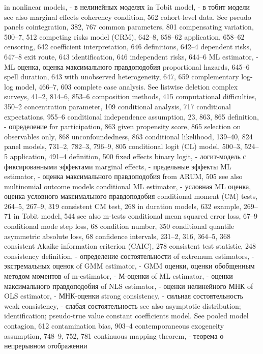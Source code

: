 in nonlinear models, - в нелинейных моделях
in Tobit model, - в тобит модели
see also marginal effects
coherency condition, 562
cohort-level data. See pseudo panels cointegration, 382, 767
common parameters, 801
compensating variation, 500–7, 512 competing risks model (CRM), 642–8, 658–62
application, 658–62 censoring, 642
coefficient interpretation, 646 definitions, 642–4
dependent risks, 647–8
exit route, 643 identification, 646 independent risks, 644–6 
ML estimator, - ML оценка, оценка максимального правдоподобия
proportional hazards, 645–6 spell duration, 643
with unobserved heterogeneity, 647, 659 complementary log-log model, 466–7, 603 complete case analysis. See listwise deletion complex surveys, 41–2, 814–6, 853–6 composition methods, 415
computational difficulties, 350–2
concentration parameter, 109
conditional analysis, 717
conditional expectations, 955–6
conditional independence assumption, 23, 863, 865
definition, - определение
for participation, 863
given propensity score, 865 selection on observables only, 868 unconfoundedness, 863
conditional likelihood, 139–40, 824
panel models, 731–2, 782–3, 796–9, 805
conditional logit (CL) model, 500–3, 524–5 application, 491–4
definition, 500
fixed effects binary logit, - логит-модель с фиксированными эффектами 
marginal effects, - предельные эффекты
ML estimator, - оценка максимального правдоподобия
from ARUM, 505
see also multinomial outcome models
conditional ML estimator, - условная ML оценка, оценка условного максимального правдоподобия
conditional moment (CM) tests, 264–5, 267–9, 319 consistent CM test, 268
in duration models, 632
example, 269–71
in Tobit model, 544
see also m-tests conditional mean
squared error loss, 67–9 conditional mode
step loss, 68 condition number, 350 conditional quantile
asymmetric absolute loss, 68
confidence intervals, 231–2, 316, 364–5, 368 consistent Akaike information criterion (CAIC), 278 consistent test statistic, 248
consistency definition, - определение состоятельности
of extremum estimators, - экстремальных оценок
of GMM estimator, - GMM оценки, оценки обобщенным методом моментов
of m-estimator, - М-оценки
of ML estimator, - оценки максимального правдоподобия
of NLS estimator, - оценки нелинейного МНК
of OLS estimator, - МНК-оценки
strong consistency, - сильная состоятельность
weak consistency, - слабая состоятельность
see also asymptotic distribution; identification;
pseudo-true value
constant coefficients model. See pooled model contagion, 612
contamination bias, 903–4
contemporaneous exogeneity assumption, 748–9, 752,
781
continuous mapping theorem, - теорема о непрерывном отображении 
